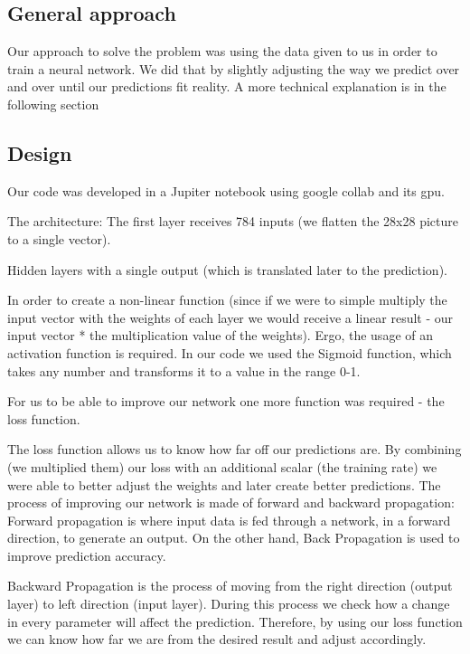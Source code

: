 \documentclass{article}
\begin{document}
\subsection{General approach}
Our approach to solve the problem was using the data given to us in order to train a neural network. We did that by slightly adjusting the way we predict over and over until our predictions fit reality. A more technical explanation is in the following section


\subsection{Design}
Our code was developed in a Jupiter notebook using google collab and its gpu.

The architecture:
\newline
The first layer receives 784 inputs (we flatten the 28x28 picture to a single vector).

Hidden layers with a single output (which is translated later to the prediction).

In order to create a non-linear function (since if we were to simple multiply the input vector with the weights of each layer we would receive a linear result - our input vector * the multiplication value of the weights).
\newline
Ergo, the usage of an activation function is required.
In our code we used the Sigmoid function, which takes any number and transforms it to a value in the range 0-1.

For us to be able to improve our network one more function was required - the loss function.

The loss function allows us to know how far off our predictions are.
By combining (we multiplied them) our loss with an additional scalar (the training rate) we were able to better adjust the weights and later create better predictions.
The process of improving our network is made of forward and backward propagation:
\newline
\newline
Forward propagation is where input data is fed through a network, in a forward direction, to generate an output. On the other hand, Back Propagation is used to improve prediction accuracy.

Backward Propagation is the process of moving from the right direction (output layer) to left direction (input layer). During this process we check how a change in every parameter will affect the prediction. Therefore, by using our loss function we can know how far we are from the desired result and adjust accordingly.
\end{document}
